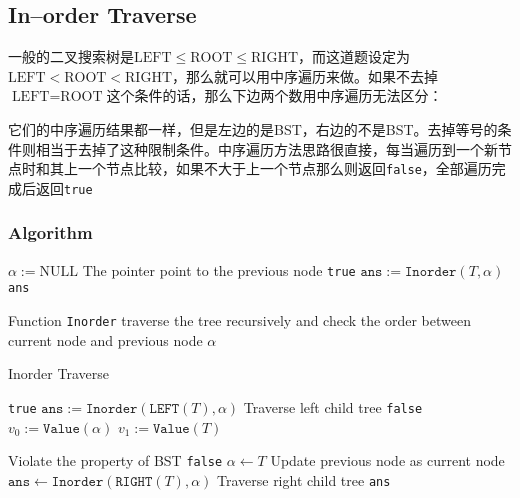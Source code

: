 \subsection{In--order Traverse}
\begin{CJK*}{UTF8}{gbsn}
一般的二叉搜索树是$\text{LEFT}\leq\text{ROOT}\leq\text{RIGHT}$，而这道题设定为$\text{LEFT}<\text{ROOT}<\text{RIGHT}$，那么就可以用中序遍历来做。如果不去掉$\text{LEFT}=\text{ROOT}$这个条件的话，那么下边两个数用中序遍历无法区分：
\begin{figure}[H]
\end{figure}
它们的中序遍历结果都一样，但是左边的是BST，右边的不是BST。去掉等号的条件则相当于去掉了这种限制条件。中序遍历方法思路很直接，每当遍历到一个新节点时和其上一个节点比较，如果不大于上一个节点那么则返回\texttt{false}，全部遍历完成后返回\texttt{true}
\end{CJK*}
\subsubsection{Algorithm}
\begin{algorithm}[H]
\begin{algorithmic}[1]
\State $\alpha:=\text{NULL}$ \Comment The pointer point to the previous node
\State \Return \texttt{true}
\EndIf
\State $\texttt{ans}:=\texttt{Inorder}(T, \alpha)$
\State \Return \texttt{ans}
\EndProcedure
\end{algorithmic}
\end{algorithm}
Function \texttt{Inorder} traverse the tree recursively and check the order between current node and previous node $\alpha$
\begin{algorithm}[H]
\caption{Inorder Traverse}
\begin{algorithmic}[1]
\State \Return \texttt{true}
\EndIf
\State $\texttt{ans}:=\texttt{Inorder}(\texttt{LEFT}(T), \alpha)$ \Comment Traverse left child tree
\State \Return \texttt{false}
\EndIf
{}
\State $v_0:=\texttt{Value}(\alpha)$
\State $v_1:=\texttt{Value}(T)$
\end{algorithmic}
\end{algorithm}
\begin{algorithm}[H]
\begin{algorithmic}[1]
 \Comment Violate the property of BST
\State \Return \texttt{false} 
\EndIf
\EndIf
\State $\alpha\gets T$ \Comment Update previous node as current node
\State $\texttt{ans}\gets \texttt{Inorder}(\texttt{RIGHT}(T), \alpha)$ \Comment Traverse right child tree
\State \Return \texttt{ans}
\EndFunction
\end{algorithmic}
\end{algorithm}
